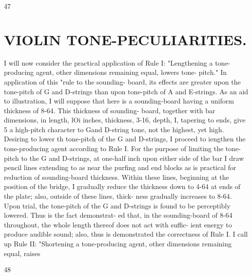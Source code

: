 \documentclass{article}
\begin{document}
47

\section*{VIOLIN TONE-PECULIARITIES.}
I will now consider the practical application of Rule I: "Lengthening a tone-producing agent, other dimensions remaining equal, lowers tone- pitch." In application of this "rule to the sounding- board, its effects are greater upon the tone-pitch of G and D-strings than upon tone-pitch of A and E-strings. As an aid to illustration, I will suppose that here is a sounding-board having a uniform thickness of 8-64. This thickness of sounding- board, together with bar dimensions, in length, lOi inches, thickness, 3-16, depth, I, tapering to ends, give 5 a high-pitch character to Gand D-string tone, not the highest, yet high. Desiring to lower th tone-pitch of the G and D-strings, I proceed to iengthen the tone-producing agent according to Rule I. For the purpose of limiting the tone-pitch to the G and D-strings, at one-half inch upon either side of the bar I draw pencil lines extending to as near the purfing and end blocks as is practical for reduction of sounding-board thickness. Within these lines, beginning at the position of the bridge, I gradually reduce the thickness down to 4-64 at ends of the plate; also, outside of these lines, thick- ness gradually increases to 8-64. Upon trial, the tone-pitch of the G and D-strings is found to be perceptibly lowered. Thus is the fact demonstrat- ed that, in the sounding-board of 8-64 throughout, the whole length thereof does not act with suffic- ient energy to produce audible sound; also, thus is demonstrated the correctness of Rule I. I call up Rule II: "Shortening a tone-producing agent, other dimensions remaining equal, raises

48
\end{document}
